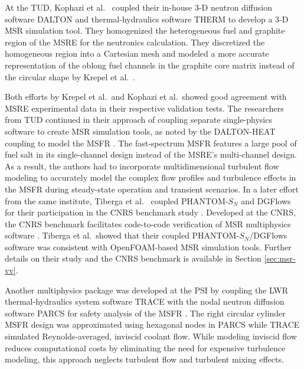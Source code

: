 At the \gls{TUD}, Kophazi et al.\
\cite{kophazi_development_2009} coupled their in-house 3-D neutron diffusion software DALTON
\cite{boer_validation_2010} and thermal-hydraulics
software THERM to develop a 3-D \gls{MSR} simulation tool. They homogenized the heterogeneous fuel
and graphite region of the \gls{MSRE} for the neutronics calculation. They discretized the
homogeneous region into a Cartesian mesh and modeled a more accurate representation of the oblong
fuel channels in the graphite core matrix instead of the circular shape by Krepel et al.\
\cite{krepel_dyn3d-msr_2007}.

Both efforts by Krepel et al.\ and Kophazi et al.\ showed good
agreement with \gls{MSRE} experimental data in their respective validation tests.
The researchers from \gls{TUD} continued in their approach of coupling separate single-physics
software to create \gls{MSR} simulation tools, as noted by the DALTON-HEAT
\cite{de_zwaan_static_2007} coupling to model the \gls{MSFR} \cite{fiorina_modelling_2014}. The
fast-spectrum \gls{MSFR} features a large pool of fuel salt in its single-channel design instead of
the \gls{MSRE}'s multi-channel design. As a result, the authors had to incorporate
multidimensional turbulent flow modeling to accurately model the complex flow profiles and
turbulence effects in the \gls{MSFR} during steady-state operation and transient scenarios. In a
later effort from the same institute, Tiberga et al.\ \cite{tiberga_discontinuous_2019} coupled
PHANTOM-$S_N$ and DGFlows for their participation in the CNRS benchmark study
\cite{tiberga_results_2020}. Developed at the \gls{CNRS}, the CNRS benchmark facilitates
code-to-code verification of \gls{MSR} multiphysics software \cite{aufiero_testing_2018}. Tiberga
et al.\ showed that their coupled PHANTOM-$S_N$/DGFlows software was consistent with
OpenFOAM-based \gls{MSR} simulation tools. Further details on their study and the CNRS benchmark
is available in Section \ref{sec:msr-vv}.

Another multiphysics package was developed at the \gls{PSI} by coupling the \gls{LWR}
thermal-hydraulics system software \gls{TRACE} \cite{nrc_trace_2007}
with the nodal neutron diffusion software \gls{PARCS} \cite{downar_parcs_2010} for safety
analysis of the \gls{MSFR} \cite{pettersen_coupled_2016}. The right circular cylinder \gls{MSFR}
design was approximated using hexagonal nodes in \gls{PARCS} while \gls{TRACE} simulated
Reynolds-averaged, inviscid coolant flow. While modeling inviscid flow reduces computational costs
by eliminating the need for expensive turbulence modeling, this approach neglects turbulent flow
and turbulent mixing effects.

